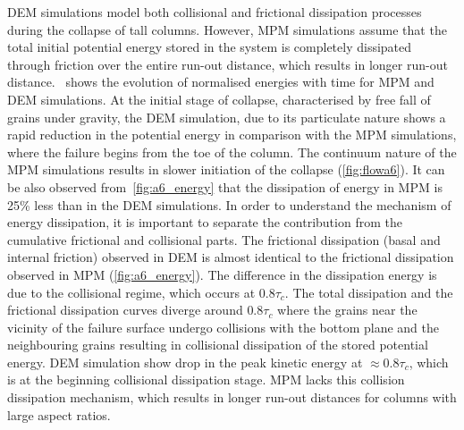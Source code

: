 DEM simulations model both collisional and frictional dissipation processes 
during the collapse of tall columns. However, MPM simulations assume that the 
total initial potential energy stored in the system is completely dissipated 
through friction over the entire run-out distance, which results in longer 
run-out distance.~ shows the evolution of normalised 
energies with time for MPM and DEM simulations. At the initial stage of 
collapse, characterised by free fall of grains under 
gravity, the DEM simulation, due to its particulate nature shows a rapid 
reduction in the potential energy in comparison with the MPM simulations, where 
the failure begins from the toe of the column. The continuum nature of the MPM 
simulations results in slower initiation of the collapse (\cref{fig:flowa6}). 
It can be also observed from~\cref{fig:a6_energy} that the dissipation of 
energy in MPM is 25\% less than in the DEM simulations. In order to understand 
the mechanism of energy dissipation, it is important to separate the 
contribution from the cumulative frictional and collisional parts. The 
frictional dissipation (basal and internal friction) observed in DEM is almost 
identical to the frictional dissipation observed in MPM (\cref{fig:a6_energy}). 
The difference in the dissipation energy is due to the collisional regime, 
which occurs at $0.8\tau_c$. The total dissipation and the frictional 
dissipation curves diverge around $0.8\tau_c$ where the grains near the 
vicinity of the failure surface undergo collisions with the bottom 
plane and the neighbouring grains resulting in collisional dissipation of the 
stored potential energy. DEM simulation show drop in the peak kinetic energy at 
$\approx0.8\tau_c$, which is at the beginning collisional dissipation stage. 
MPM lacks this collision dissipation mechanism, which results in longer run-out 
distances for columns with large aspect ratios. 

